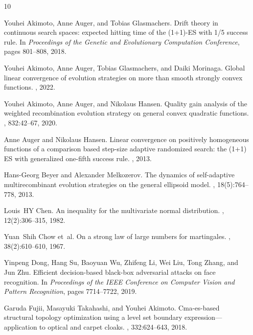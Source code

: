 \documentclass[journal]{IEEEtran}
\theoremstyle{definition}
\begin{document}
% 
% 
%
\begin{thebibliography}{10}

Youhei Akimoto, Anne Auger, and Tobias Glasmachers.
\newblock Drift theory in continuous search spaces: expected hitting time of
  the {(1+1)-ES} with 1/5 success rule.
\newblock In {\em Proceedings of the Genetic and Evolutionary Computation
  Conference}, pages 801--808, 2018.

Youhei Akimoto, Anne Auger, Tobias Glasmachers, and Daiki Morinaga.
\newblock Global linear convergence of evolution strategies on more than smooth
  strongly convex functions.
, 2022.

Youhei Akimoto, Anne Auger, and Nikolaus Hansen.
\newblock Quality gain analysis of the weighted recombination evolution
  strategy on general convex quadratic functions.
, 832:42--67, 2020.

Anne Auger and Nikolaus Hansen.
\newblock Linear convergence on positively homogeneous functions of a
  comparison based step-size adaptive randomized search: the {(1+1) ES} with
  generalized one-fifth success rule.
, 2013.

Hans-Georg Beyer and Alexander Melkozerov.
\newblock The dynamics of self-adaptive multirecombinant evolution strategies
  on the general ellipsoid model.
, 18(5):764--778,
  2013.

Louis~HY Chen.
\newblock An inequality for the multivariate normal distribution.
, 12(2):306--315, 1982.

Yuan~Shih Chow et~al.
\newblock On a strong law of large numbers for martingales.
, 38(2):610--610, 1967.

Yinpeng Dong, Hang Su, Baoyuan Wu, Zhifeng Li, Wei Liu, Tong Zhang, and Jun
  Zhu.
\newblock Efficient decision-based black-box adversarial attacks on face
  recognition.
\newblock In {\em Proceedings of the IEEE Conference on Computer Vision and
  Pattern Recognition}, pages 7714--7722, 2019.

Garuda Fujii, Masayuki Takahashi, and Youhei Akimoto.
\newblock Cma-es-based structural topology optimization using a level set
  boundary expression—application to optical and carpet cloaks.
,
  332:624--643, 2018.


\end{thebibliography}
\end{document}
